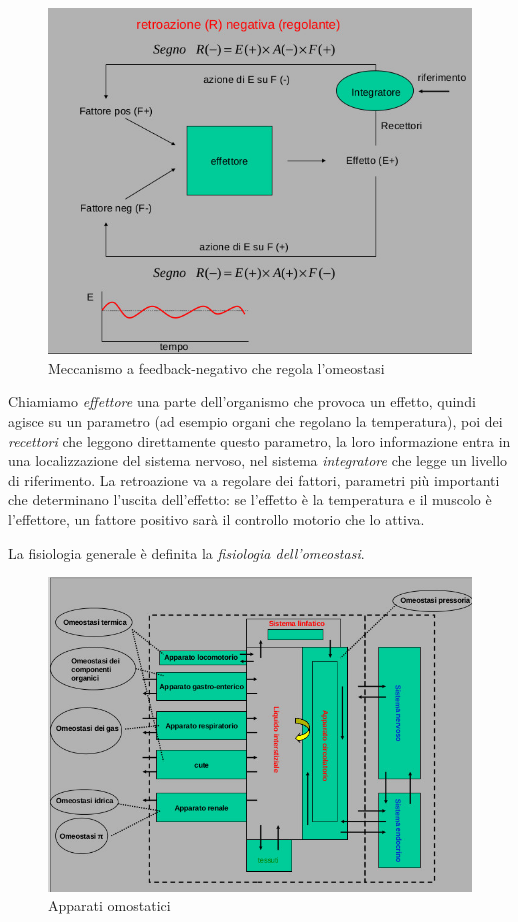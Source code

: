\documentclass[a4paper,12pt]{article}
\begin{document}
\begin{figure}[H]
\centering
\includegraphics[scale=0.35]{immagine/retroazione.jpg}
\caption{Meccanismo a feedback-negativo che regola l'omeostasi}
\end{figure}

Chiamiamo \emph{effettore} una parte dell'organismo che provoca un effetto, quindi agisce su un parametro (ad esempio organi che regolano la temperatura), poi dei \emph{recettori} che leggono direttamente questo parametro, la loro informazione entra in una localizzazione del sistema nervoso, nel sistema \emph{integratore} che legge un livello di riferimento. La retroazione va a regolare dei fattori, parametri più importanti che determinano l'uscita dell'effetto: se l'effetto è la temperatura e il muscolo è l'effettore, un fattore positivo sarà il controllo motorio che lo attiva.

La fisiologia generale è definita la \emph{fisiologia dell'omeostasi}. 

\begin{figure}[H]
\centering
\includegraphics[scale=0.35]{immagine/fisiologia.jpg}
\caption{Apparati omostatici}
\end{figure}
\end{document}
